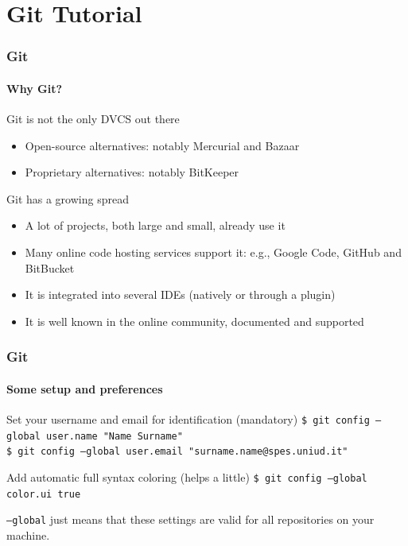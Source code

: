 \section{Git Tutorial}

\begin{frame}
\frametitle{Git}
\framesubtitle{Why Git?}

\begin{block}{Git is not the only DVCS out there}
\begin{itemize}
\item Open-source alternatives: notably Mercurial and Bazaar
\item Proprietary alternatives: notably BitKeeper
\end{itemize}
\end{block}
\pause
\begin{block}{Git has a growing spread}
\begin{itemize}
\item A lot of projects, both large and small, already use it
\item Many online code hosting services support it: e.g., Google Code, GitHub and BitBucket
\item It is integrated into several IDEs (natively or through a plugin)
\item It is well known in the online community, documented and supported
\end{itemize}
\end{block}
\end{frame}


\begin{frame}
\frametitle{Git}
\framesubtitle{Some setup and preferences}

\begin{block}{Set your username and email for identification (mandatory)}
\texttt{\$ git config ---global user.name "Name Surname"} \\
\texttt{\$ git config ---global user.email "surname.name@spes.uniud.it"}
\end{block}

\begin{block}{Add automatic full syntax coloring (helps a little)}
\texttt{\$ git config ---global color.ui true}
\end{block}
\pause
\texttt{---global} just means that these settings are valid for all repositories on your machine.
\end{frame}

